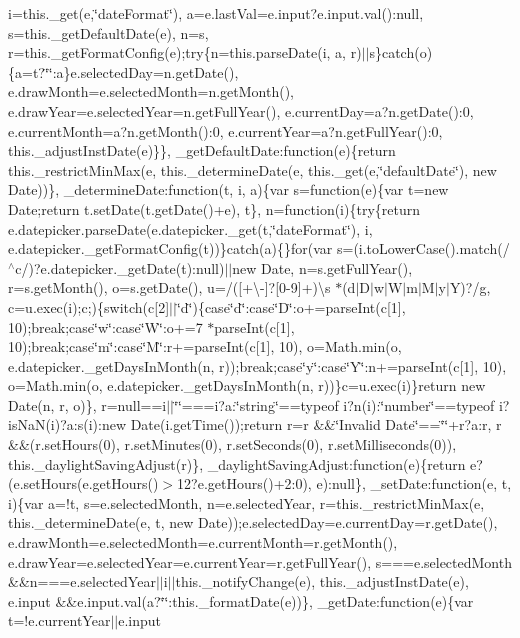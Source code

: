\begin{DoxyCompactItemize}
i=this.\+\_\+get(e,\char`\"{}date\+Format\char`\"{}), a=e.\+last\+Val=e.\+input?e.\+input.\+val()\+:null, s=this.\+\_\+get\+Default\+Date(e), n=s, r=this.\+\_\+get\+Format\+Config(e);try\{n=this.\+parse\+Date(i, a, r)$\vert$$\vert$s\}catch(o)\{a=t?\char`\"{}\char`\"{}\+:a\}e.\+selected\+Day=n.\+get\+Date(), e.\+draw\+Month=e.\+selected\+Month=n.\+get\+Month(), e.\+draw\+Year=e.\+selected\+Year=n.\+get\+Full\+Year(), e.\+current\+Day=a?n.\+get\+Date()\+:0, e.\+current\+Month=a?n.\+get\+Month()\+:0, e.\+current\+Year=a?n.\+get\+Full\+Year()\+:0, this.\+\_\+adjust\+Inst\+Date(e)\}\}, \+\_\+get\+Default\+Date\+:function(e)\{return this.\+\_\+restrict\+Min\+Max(e, this.\+\_\+determine\+Date(e, this.\+\_\+get(e,\char`\"{}default\+Date\char`\"{}), new Date))\}, \+\_\+determine\+Date\+:function(t, i, a)\{var s=function(e)\{var t=new Date;return t.\+set\+Date(t.\+get\+Date()+e), t\}, n=function(i)\{try\{return e.\+datepicker.\+parse\+Date(e.\+datepicker.\+\_\+get(t,\char`\"{}date\+Format\char`\"{}), i, e.\+datepicker.\+\_\+get\+Format\+Config(t))\}catch(a)\{\}for(var s=(i.\+to\+Lower\+Case().\+match(/$^\wedge$c/)?e.\+datepicker.\+\_\+get\+Date(t)\+:null)$\vert$$\vert$new Date, n=s.\+get\+Full\+Year(), r=s.\+get\+Month(), o=s.\+get\+Date(), u=/(\mbox{[}+\textbackslash{}-\/\mbox{]}?\mbox{[}0-\/9\mbox{]}+)\textbackslash{}s $\ast$(d$\vert$\+D$\vert$w$\vert$\+W$\vert$m$\vert$\+M$\vert$y$\vert$\+Y)?/g, c=u.\+exec(i);c;)\{switch(c\mbox{[}2\mbox{]}$\vert$$\vert$\char`\"{}d\char`\"{})\{case\char`\"{}d\char`\"{}\+:case\char`\"{}\+D\char`\"{}\+:o+=parse\+Int(c\mbox{[}1\mbox{]}, 10);break;case\char`\"{}w\char`\"{}\+:case\char`\"{}\+W\char`\"{}\+:o+=7 $\ast$parse\+Int(c\mbox{[}1\mbox{]}, 10);break;case\char`\"{}m\char`\"{}\+:case\char`\"{}\+M\char`\"{}\+:r+=parse\+Int(c\mbox{[}1\mbox{]}, 10), o=\+Math.\+min(o, e.\+datepicker.\+\_\+get\+Days\+In\+Month(n, r));break;case\char`\"{}y\char`\"{}\+:case\char`\"{}\+Y\char`\"{}\+:n+=parse\+Int(c\mbox{[}1\mbox{]}, 10), o=\+Math.\+min(o, e.\+datepicker.\+\_\+get\+Days\+In\+Month(n, r))\}c=u.\+exec(i)\}return new Date(n, r, o)\}, r=null==i$\vert$$\vert$\char`\"{}\char`\"{}===i?a\+:\char`\"{}string\char`\"{}==typeof i?n(i)\+:\char`\"{}number\char`\"{}==typeof i?is\+Na\+N(i)?a\+:s(i)\+:new Date(i.\+get\+Time());return r=r \&\&\char`\"{}\+Invalid Date\char`\"{}==\char`\"{}\char`\"{}+r?a\+:r, r \&\&(r.\+set\+Hours(0), r.\+set\+Minutes(0), r.\+set\+Seconds(0), r.\+set\+Milliseconds(0)), this.\+\_\+daylight\+Saving\+Adjust(r)\}, \+\_\+daylight\+Saving\+Adjust\+:function(e)\{return e?(e.\+set\+Hours(e.\+get\+Hours()$>$12?e.\+get\+Hours()+2\+:0), e)\+:null\}, \+\_\+set\+Date\+:function(e, t, i)\{var a=!t, s=e.\+selected\+Month, n=e.\+selected\+Year, r=this.\+\_\+restrict\+Min\+Max(e, this.\+\_\+determine\+Date(e, t, new Date));e.\+selected\+Day=e.\+current\+Day=r.\+get\+Date(), e.\+draw\+Month=e.\+selected\+Month=e.\+current\+Month=r.\+get\+Month(), e.\+draw\+Year=e.\+selected\+Year=e.\+current\+Year=r.\+get\+Full\+Year(), s===e.\+selected\+Month \&\&n===e.\+selected\+Year$\vert$$\vert$i$\vert$$\vert$this.\+\_\+notify\+Change(e), this.\+\_\+adjust\+Inst\+Date(e), e.\+input \&\&e.\+input.\+val(a?\char`\"{}\char`\"{}\+:this.\+\_\+format\+Date(e))\}, \+\_\+get\+Date\+:function(e)\{var t=!e.\+current\+Year$\vert$$\vert$e.\+input 
\end{DoxyCompactItemize}
